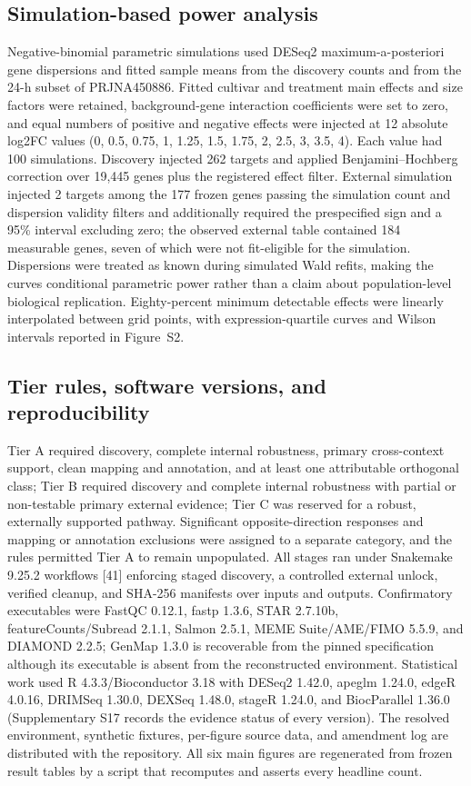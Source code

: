 \documentclass[11pt]{article}
\begin{document}
\subsection{Simulation-based power analysis}

Negative-binomial parametric simulations used DESeq2 maximum-a-posteriori gene dispersions and fitted sample means from the discovery counts and from the 24-h subset of PRJNA450886. Fitted cultivar and treatment main effects and size factors were retained, background-gene interaction coefficients were set to zero, and equal numbers of positive and negative effects were injected at 12 absolute log2FC values (0, 0.5, 0.75, 1, 1.25, 1.5, 1.75, 2, 2.5, 3, 3.5, 4). Each value had 100 simulations. Discovery injected 262 targets and applied Benjamini--Hochberg correction over 19,445 genes plus the registered effect filter. External simulation injected 2 targets among the 177 frozen genes passing the simulation count and dispersion validity filters and additionally required the prespecified sign and a 95\% interval excluding zero; the observed external table contained 184 measurable genes, seven of which were not fit-eligible for the simulation. Dispersions were treated as known during simulated Wald refits, making the curves conditional parametric power rather than a claim about population-level biological replication. Eighty-percent minimum detectable effects were linearly interpolated between grid points, with expression-quartile curves and Wilson intervals reported in Figure~S2.

\subsection{Tier rules, software versions, and reproducibility}

Tier A required discovery, complete internal robustness, primary cross-context support, clean mapping and annotation, and at least one attributable orthogonal class; Tier B required discovery and complete internal robustness with partial or non-testable primary external evidence; Tier C was reserved for a robust, externally supported pathway. Significant opposite-direction responses and mapping or annotation exclusions were assigned to a separate category, and the rules permitted Tier A to remain unpopulated. All stages ran under Snakemake 9.25.2 workflows [41] enforcing staged discovery, a controlled external unlock, verified cleanup, and SHA-256 manifests over inputs and outputs. Confirmatory executables were FastQC 0.12.1, fastp 1.3.6, STAR 2.7.10b, featureCounts/Subread 2.1.1, Salmon 2.5.1, MEME Suite/AME/FIMO 5.5.9, and DIAMOND 2.2.5; GenMap 1.3.0 is recoverable from the pinned specification although its executable is absent from the reconstructed environment. Statistical work used R 4.3.3/Bioconductor 3.18 with DESeq2 1.42.0, apeglm 1.24.0, edgeR 4.0.16, DRIMSeq 1.30.0, DEXSeq 1.48.0, stageR 1.24.0, and BiocParallel 1.36.0 (Supplementary S17 records the evidence status of every version). The resolved environment, synthetic fixtures, per-figure source data, and amendment log are distributed with the repository. All six main figures are regenerated from frozen result tables by a script that recomputes and asserts every headline count.
\end{document}
